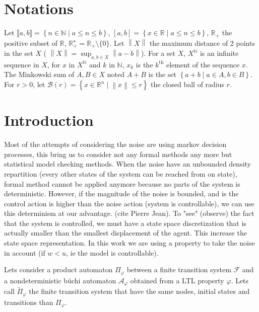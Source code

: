 \documentclass{article}
\theoremstyle{named}
\begin{document}
\section*{Notations}

Let $\llbracket a,b \rrbracket = \left \{n \in \mathbb{N} \mid a \leq n \leq b \right \}$, $\left [ a,b \right ]= \left \{x \in \mathbb{R} \mid a \leq n \leq b \right \}$, $\mathbb{R}_+$ the positive subset of $\mathbb{R}$, $\mathbb{R}_+^\star = \mathbb{R}_+ \setminus \{0\}$.
Let $\left \| X \right \|$ the maximum distance of 2 points in the set $X$ ( $\left \| X \right \| = \sup_{a,b \in X} \left \| a-b\right \|$).
For a set $X$, $X^\mathbb{N}$ is an infinite sequence in $X$, for $x$ in $X^\mathbb{N}$ and $k$ in $\mathbb{N}$, $x_k$ is the $k^\textrm{th}$ element of the sequence $x$.
The Minkowski sum of $A,B \in X$ noted $A+B$ is the set $\left \{a+b \mid a \in A, b\in B \right \}$.
For $r>0$, let $\mathcal{B}(r) = \left \{ x \in \mathbb{R}^n \mid \left \| x \right \| \leq r \right \}$ the closed ball of radius $r$.

\section*{Introduction}
Most of the attempts of considering the noise are using markov decision processes, this bring us to consider not any formal methods any more but statistical model checking methods. When the noise have an unbounded density repartition (every other states of the system can be reached from on state), formal method cannot be applied anymore because no parts of the system is deterministic. However, if the magnitude of the noise is bounded, and is the control action is higher than the noise action (system is controllable), we can use this determinism at our advantage. (cite Pierre Jean).
To "see" (observe) the fact that the system is controlled, we must have a state space discretization that is actually smaller than the smallest displacement of the agent. This increase the state space representation. In this work we are using a property to take the noise in account (if $w<u$, ie the model is controllable).

Lets consider a product automaton $\Pi_\varphi$ between a finite transition system $\mathcal{F}$ and a nondeterministic b\"uchi automaton $\mathcal{A}_\varphi$ obtained from a LTL property $\varphi$. Lets call $\widetilde{\Pi}_\varphi$ the finite transition system that have the same nodes, initial states and transitions than $\Pi_\varphi$.
\end{document}
